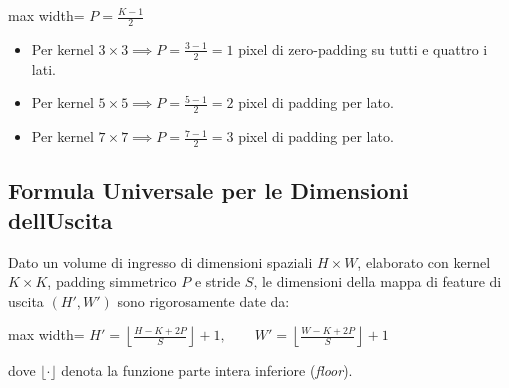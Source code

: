\documentclass[11pt,a4paper,oneside,openany]{book}
\providecommand{\tightlist}{\setlength{\itemsep}{0pt}\setlength{\parskip}{0pt}}
\begin{document}
\begin{center}
\begin{adjustbox}{max width=\linewidth}
$\displaystyle 
\boxed{P = \frac{K - 1}{2}}
$
\end{adjustbox}
\end{center}

\begin{itemize}
\tightlist
\item
  Per kernel \(3 \times 3 \implies P = \frac{3 - 1}{2} = 1\) pixel di zero-padding su tutti e quattro i lati.
\item
  Per kernel \(5 \times 5 \implies P = \frac{5 - 1}{2} = 2\) pixel di padding per lato.
\item
  Per kernel \(7 \times 7 \implies P = \frac{7 - 1}{2} = 3\) pixel di padding per lato.
\end{itemize}

\subsection{Formula Universale per le Dimensioni dell\textquotesingle Uscita}\label{f02-r590}

Dato un volume di ingresso di dimensioni spaziali \(H \times W\), elaborato con kernel \(K \times K\), padding simmetrico \(P\) e stride \(S\), le dimensioni della mappa di feature di uscita \((H', W')\) sono rigorosamente date da:

\begin{center}
\begin{adjustbox}{max width=\linewidth}
$\displaystyle 
\boxed{H' = \left\lfloor \frac{H - K + 2P}{S} \right\rfloor + 1, \qquad W' = \left\lfloor \frac{W - K + 2P}{S} \right\rfloor + 1}
$
\end{adjustbox}
\end{center}

dove \(\lfloor \cdot \rfloor\) denota la funzione parte intera inferiore (\emph{floor}).
\end{document}
